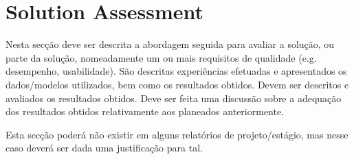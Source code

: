 \section{Solution Assessment} %
\label{sec:assessment}

Nesta secção deve ser descrita a abordagem seguida para avaliar a solução, ou parte da solução, nomeadamente um ou mais requisitos de qualidade (e.g. desempenho, usabilidade). São descritas experiências efetuadas e apresentados os dados/modelos utilizados, bem como os resultados obtidos. Devem ser descritos e avaliados os resultados obtidos. Deve ser feita uma discussão sobre a adequação dos resultados obtidos relativamente aos planeados anteriormente.

Esta secção poderá não existir em alguns relatórios de projeto/estágio, mas nesse caso deverá ser dada uma justificação para tal.


